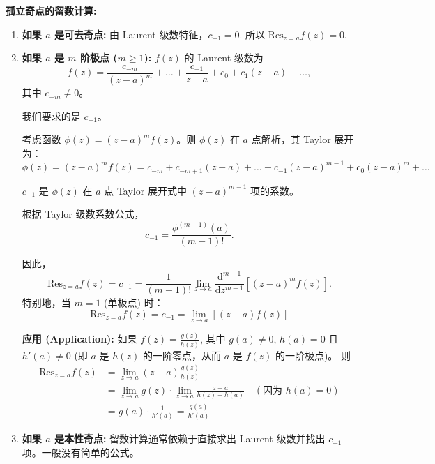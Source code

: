 \documentclass[linespread=1.5,openany]{book}%
\theoremstyle{plain}
\begin{document}
{{{{{{{									
									
									
									\vspace{\baselineskip}
									
									\textbf{孤立奇点的留数计算:}
									\begin{enumerate}[label=(\roman*)]
										\item \textbf{如果 $a$ 是可去奇点:}
										由 Laurent 级数特征，$c_{-1}=0$. 所以 $\text{Res}_{z=a} f(z) = 0$.
										
										\item \textbf{如果 $a$ 是 $m$ 阶极点 ($m \ge 1$):}
										$f(z)$ 的 Laurent 级数为
										\[
										f(z) = \frac{c_{-m}}{(z-a)^m} + \dots + \frac{c_{-1}}{z-a} + c_0 + c_1(z-a) + \dots,
										\]
										其中 $c_{-m} \neq 0$。
										
										我们要求的是 $c_{-1}$。
										
										考虑函数 $\phi(z) = (z-a)^m f(z)$。则 $\phi(z)$ 在 $a$ 点解析，其 Taylor 展开为：
										\[
										\phi(z) = (z-a)^m f(z) = c_{-m} + c_{-m+1}(z-a) + \dots + c_{-1}(z-a)^{m-1} + c_0(z-a)^m + \dots
										\]
										
										$c_{-1}$ 是 $\phi(z)$ 在 $a$ 点 Taylor 展开式中 $(z-a)^{m-1}$ 项的系数。
										
										根据 Taylor 级数系数公式，
										\[
										c_{-1} = \frac{\phi^{(m-1)}(a)}{(m-1)!}.
										\]
										
										因此，
										\[
										\text{Res}_{z=a} f(z) = c_{-1} = \frac{1}{(m-1)!} \lim_{z \to a} \frac{\mathrm{d}^{m-1}}{\mathrm{d}z^{m-1}} \left[ (z-a)^m f(z) \right].
										\]
										特别地，当 $m=1$ (单极点) 时：
										\[ \text{Res}_{z=a} f(z) = c_{-1} = \lim_{z\to a} [(z-a)f(z)] \]
										
										
										\textbf{应用 (Application):} 如果 $f(z) = \frac{g(z)}{h(z)}$, 其中 $g(a)\neq 0$, $h(a)=0$ 且 $h'(a)\neq 0$ (即 $a$ 是 $h(z)$ 的一阶零点，从而 $a$ 是 $f(z)$ 的一阶极点)。
										则
										\begin{align*}
											\text{Res}_{z=a} f(z) &= \lim_{z\to a} (z-a) \frac{g(z)}{h(z)} \\
											&= \lim_{z\to a} g(z) \cdot \lim_{z\to a} \frac{z-a}{h(z)-h(a)} \quad (\text{因为 } h(a)=0) \\
											&= g(a) \cdot \frac{1}{h'(a)} = \frac{g(a)}{h'(a)}
										\end{align*}
										
										
										\item \textbf{如果 $a$ 是本性奇点:}
										留数计算通常依赖于直接求出 Laurent 级数并找出 $c_{-1}$ 项。一般没有简单的公式。
										

\end{enumerate}}}}}}}}
\end{document}
